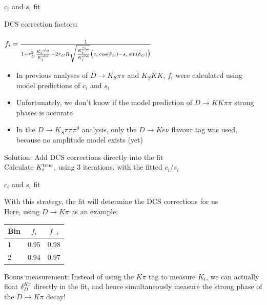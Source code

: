 \documentclass{beamer}
\begin{document}
\begin{frame}{$c_i$ and $s_i$ fit}
  \begin{center}
    {\Large DCS correction factors:}\\~\\
    $f_i = \frac{1}{1 + r_D^2\frac{\bar{K_i}^{\rm obs}}{K_i^{\rm obs}} - 2r_DR\sqrt{\frac{\bar{K_i^{\rm obs}}}{K_i^{\rm obs}}}\big(c_i\cos(\delta_D) - s_i\sin(\delta_D)\big)}$
  \end{center}
  \begin{itemize}
    \setlength\itemsep{1.0em}
    \item{In previous analyses of $D\to K_S\pi\pi$ and $K_SKK$, $f_i$ were calculated using model predictions of $c_i$ and $s_i$}
    \item{Unfortunately, we don't know if the model prediction of $D\to KK\pi\pi$ strong phases is accurate}
    \item{In the $D\to K_S\pi\pi\pi^0$ analysis, only the $D\to Ke\nu$ flavour tag was used, because no amplitude model exists (yet)}
  \end{itemize}
  \begin{center}
    Solution: Add DCS corrections directly into the fit\\
    Calculate $K_i^{\rm true}$, using 3 iterations, with the fitted $c_i$/$s_i$
  \end{center}
\end{frame}

\begin{frame}{$c_i$ and $s_i$ fit}
  \begin{center}
    With this strategy, the fit will determine the DCS corrections for us\\
    Here, using $D\to K\pi$ as an example:
  \end{center}
  \vspace{0.5cm}
  \centering
  \def\arraystretch{1.2}%
  \begin{tabular}{lcc}
    Bin     & $f_i$  & $f_{-i}$ \\
    \hline
    $1$     & $0.95$ & $0.98$ \\
    $2$     & $0.94$ & $0.97$ \\
    \hline
  \end{tabular}
  \vspace{1.0cm}
  \begin{center}
    Bonus measurement: Instead of using the $K\pi$ tag to measure $K_i$, we can actually float $\delta_D^{K\pi}$ directly in the fit, and hence simultaneously measure the strong phase of the $D\to K\pi$ decay!
  \end{center}
\end{frame}
\end{document}
